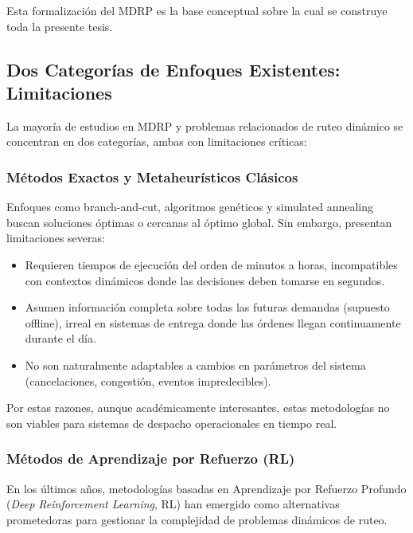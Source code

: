 Esta formalización del MDRP es la base conceptual sobre la cual se construye 
toda la presente tesis.

\subsection{Dos Categorías de Enfoques Existentes: Limitaciones}

La mayoría de estudios en MDRP y problemas relacionados de ruteo dinámico 
se concentran en dos categorías, ambas con limitaciones críticas:

\subsubsection{Métodos Exactos y Metaheurísticos Clásicos}

Enfoques como branch-and-cut, algoritmos genéticos y simulated annealing 
buscan soluciones óptimas o cercanas al óptimo global. Sin embargo, presentan 
limitaciones severas:

\begin{itemize}
    \item Requieren tiempos de ejecución del orden de minutos a horas, 
    incompatibles con contextos dinámicos donde las decisiones deben tomarse 
    en segundos.
    
    \item Asumen información completa sobre todas las futuras demandas 
    (supuesto offline), irreal en sistemas de entrega donde las órdenes 
    llegan continuamente durante el día.
    
    \item No son naturalmente adaptables a cambios en parámetros del sistema 
    (cancelaciones, congestión, eventos impredecibles).
\end{itemize}

Por estas razones, aunque académicamente interesantes, estas metodologías 
no son viables para sistemas de despacho operacionales en tiempo real.

\subsubsection{Métodos de Aprendizaje por Refuerzo (RL)}

En los últimos años, metodologías basadas en Aprendizaje por Refuerzo 
Profundo (\textit{Deep Reinforcement Learning}, RL) han emergido como 
alternativas prometedoras para gestionar la complejidad de problemas 
dinámicos de ruteo.

